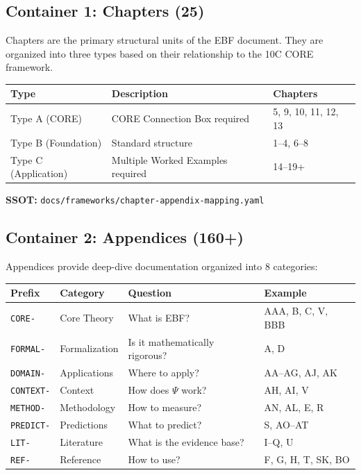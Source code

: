 \subsection{Container 1: Chapters (25)}
\label{sec:bo-chapters}

Chapters are the primary structural units of the EBF document. They are organized
into three types based on their relationship to the 10C CORE framework.

\begin{center}
\begin{tabular}{|l|l|l|}
\hline
\textbf{Type} & \textbf{Description} & \textbf{Chapters} \\
\hline
Type A (CORE) & CORE Connection Box required & 5, 9, 10, 11, 12, 13 \\
Type B (Foundation) & Standard structure & 1--4, 6--8 \\
Type C (Application) & Multiple Worked Examples required & 14--19+ \\
\hline
\end{tabular}
\end{center}

\textbf{SSOT:} \texttt{docs/frameworks/chapter-appendix-mapping.yaml}


\subsection{Container 2: Appendices (160+)}
\label{sec:bo-appendices}

Appendices provide deep-dive documentation organized into 8 categories:

\begin{center}
\begin{tabular}{|l|l|l|l|}
\hline
\textbf{Prefix} & \textbf{Category} & \textbf{Question} & \textbf{Example} \\
\hline
\texttt{CORE-} & Core Theory & What is EBF? & AAA, B, C, V, BBB \\
\texttt{FORMAL-} & Formalization & Is it mathematically rigorous? & A, D \\
\texttt{DOMAIN-} & Applications & Where to apply? & AA--AG, AJ, AK \\
\texttt{CONTEXT-} & Context & How does $\Psi$ work? & AH, AI, V \\
\texttt{METHOD-} & Methodology & How to measure? & AN, AL, E, R \\
\texttt{PREDICT-} & Predictions & What to predict? & S, AO--AT \\
\texttt{LIT-} & Literature & What is the evidence base? & I--Q, U \\
\texttt{REF-} & Reference & How to use? & F, G, H, T, SK, BO \\
\hline
\end{tabular}
\end{center}

